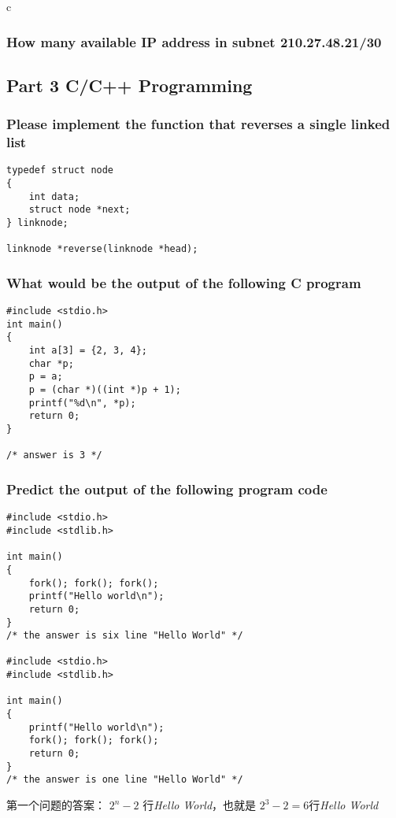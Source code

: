 \documentclass{article}
\begin{document}
\begin{mitned}{c}
\subsubsection{How many available IP address in subnet 210.27.48.21/30}

\subsection{Part 3 C/C++ Programming}

\subsubsection{Please implement the function that reverses a single linked list}
\begin{verbatim}
typedef struct node
{
	int data;
	struct node *next;
} linknode;

linknode *reverse(linknode *head);
\end{verbatim}

\subsubsection{What would be the output of the following C program}
\begin{verbatim}
#include <stdio.h>
int main()
{
	int a[3] = {2, 3, 4};
	char *p;
	p = a;
	p = (char *)((int *)p + 1);
	printf("%d\n", *p);
	return 0;
}

/* answer is 3 */
\end{verbatim}

\subsubsection{Predict the output of the following program code}
\begin{verbatim}
#include <stdio.h>
#include <stdlib.h>

int main()
{
	fork(); fork(); fork();
	printf("Hello world\n");
	return 0;
}
/* the answer is six line "Hello World" */

#include <stdio.h>
#include <stdlib.h>

int main()
{
	printf("Hello world\n");
	fork(); fork(); fork();
	return 0;
}
/* the answer is one line "Hello World" */

\end{verbatim}

第一个问题的答案： $ 2^n - 2 $ 行\textit{Hello World}，也就是 $ 2^3 -2 = 6 $行\textit{Hello World}



\end{mitned}
\end{document}
